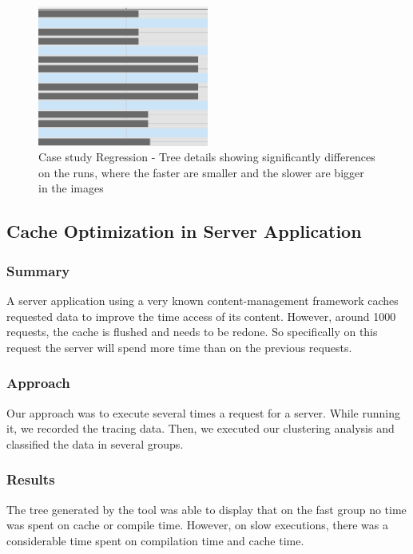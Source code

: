     \begin{figure}[h]
          \centering
            \includegraphics[width=0.50\textwidth]{figures/showing_diff.png}
            \caption{Case study Regression - Tree details showing significantly differences on the runs, where the faster are smaller and the slower are bigger in the images}
            \label{fig:case1}
    \end{figure}

    
\subsection{\textbf{Cache Optimization in Server Application}}
    
\subsubsection{Summary}
    A server application using a very known content-management framework caches requested data to improve the time access of its content. However, around 1000 requests, the cache is flushed and needs to be redone. So specifically on this request the server will spend more time than on the previous requests.
    
\subsubsection{Approach}
    Our approach was to execute several times a request for a server. While running it, we recorded the tracing data. Then, we executed our clustering analysis and classified the data in several groups.
    
\subsubsection{Results}
    The tree generated by the tool was able to display that on the fast group no time was spent on cache or compile time. However, on slow executions, there was a considerable time spent on compilation time and cache time.
        
